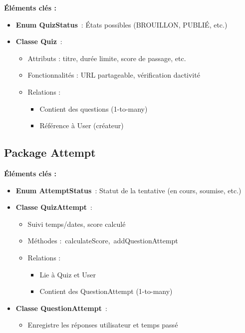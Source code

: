 \documentclass[12pt,a4paper,twoside]{report}
\begin{document}
\textbf{Éléments clés :}

\begin{itemize}
\item
  \textbf{Enum QuizStatus}~: États possibles (BROUILLON, PUBLIÉ, etc.)
\item
  \textbf{Classe Quiz}~:

  \begin{itemize}
  \item
    Attributs : titre, durée limite, score de passage, etc.
  \item
    Fonctionnalités : URL partageable, vérification
    d\textquotesingle activité
  \item
    Relations :

    \begin{itemize}
    \item
      Contient des questions (1-to-many)
    \item
      Référence à User (créateur)
    \end{itemize}
  \end{itemize}
\end{itemize}

\hypertarget{package-attempt}{%
\subsection{Package Attempt}\label{package-attempt}}

\textbf{Éléments clés :}

\begin{itemize}
\item
  \textbf{Enum AttemptStatus}~: Statut de la tentative (en cours,
  soumise, etc.)
\item
  \textbf{Classe QuizAttempt}~:

  \begin{itemize}
  \item
    Suivi temps/dates, score calculé
  \item
    Méthodes :~calculateScore,~addQuestionAttempt
  \item
    Relations :

    \begin{itemize}
    \item
      Lie à Quiz et User
    \item
      Contient des QuestionAttempt (1-to-many)
    \end{itemize}
  \end{itemize}
\item
  \textbf{Classe QuestionAttempt}~:

  \begin{itemize}
  \item
    Enregistre les réponses utilisateur et temps passé
  \end{itemize}
\end{itemize}
\end{document}
